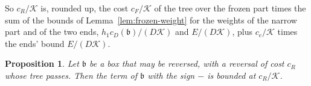 \documentclass[11pt]{article}
\newtheorem{proposition}[theorem]{Proposition}
\theoremstyle{definition}
\begin{document}
So $c_R/\mathcal K$ is, rounded up, the cost $c_F/\mathcal K$ of the tree over the frozen part times the sum of the
bounds of Lemma~\ref{lem:frozen-weight} for the weights of the narrow part and of the two ends, $h_1 c_D(\mathfrak
b)/(D\mathcal K)$ and $E/(D\mathcal K)$, plus $c_e/\mathcal K$ times the ends' bound $E/(D\mathcal K)$.

\begin{proposition}\label{prop:reversal}
Let $\mathfrak b$ be a box that may be reversed, with a reversal of cost $c_R$ whose tree passes. Then the term of
$\mathfrak b$ with the sign $-$ is bounded at $c_R/\mathcal K$.
\end{proposition}
\end{document}
